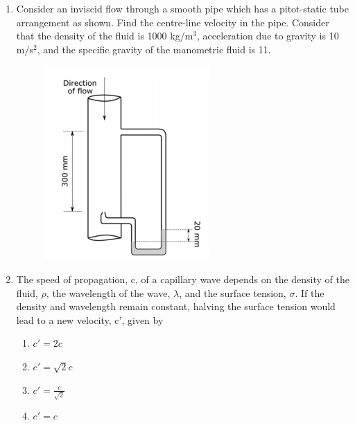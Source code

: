 \documentclass[a4paper,10pt]{article}
\begin{document}
\begin{enumerate}
\hfill{}

\item Consider an inviscid flow through a smooth pipe which has a pitot-static tube arrangement as shown. Find the centre-line velocity in the pipe. Consider that the density of the fluid is 1000 kg/m$^3$, acceleration due to gravity is 10 m/s$^2$, and the specific gravity of the manometric fluid is 11.
\begin{figure}[H]
    \centering
    \includegraphics[width=0.3\columnwidth]{q31.png}
    \caption*{}
    \label{fig:q31}
\end{figure}

\hfill{}
\begin{enumerate}
\end{enumerate}

\item The speed of propagation, c, of a capillary wave depends on the density of the fluid, $\rho$, the wavelength of the wave, $\lambda$, and the surface tension, $\sigma$. If the density and wavelength remain constant, halving the surface tension would lead to a new velocity, c', given by

\hfill{}
\begin{enumerate}
    \item $c' = 2c$
    \item $c' = \sqrt{2}c$
    \item $c' = \frac{c}{\sqrt{2}}$
    \item $c' = c$
\end{enumerate}


\end{enumerate}
\end{document}
